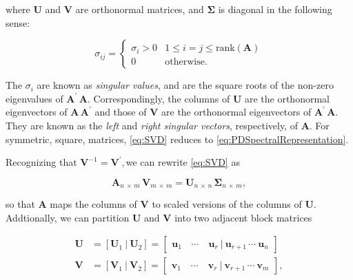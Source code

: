 \documentclass[graybox,envcountchap,sectrefs]{svmono}\usepackage[]{graphicx}\usepackage[]{xcolor}
\begin{document}
\begin{appendices}
where $\mathbf{U}$ and $\mathbf{V}$ are orthonormal matrices, and
$\mathbf{\mathbf{\Sigma}}$ is diagonal in the following sense:

\begin{equation}
\sigma_{ij}=\begin{cases}
\sigma_{i}>0 & 1\leqslant i=j\leqslant\mathrm{rank}\left(\mathbf{A}\right)\\
0 & \mathrm{otherwise}.
\end{cases}\label{eq:DiagMatrixInSVD}
\end{equation}

The $\sigma_{i}$ are known as \emph{singular values}, and are the
square roots of the non-zero eigenvalues of $\mathbf{A}^{\prime}\,\mathbf{A}$.
Correspondingly, the columns of $\mathbf{U}$ are the orthonormal
eigenvectors of $\mathbf{A}\,\mathbf{A}^{\prime}$ and those of $\mathbf{V}$
are the orthonormal eigenvectors of $\mathbf{A}^{\prime}\,\mathbf{A}$.
They are known as the \emph{left} and \emph{right singular vectors},
respectively, of $\mathrm{\mathbf{A}}$. For symmetric, square, matrices,
\eqref{eq:SVD} reduces to \eqref{eq:PDSpectralRepresentation}.

Recognizing that $\mathbf{V}^{-1}=\mathbf{V}^{\prime},$we can rewrite
\eqref{eq:SVD} as

\begin{equation}
\mathbf{\mathbf{A}}_{n\,\times\,m}\,\mathbf{V}_{m\,\times\,m}=\mathbf{U}_{n\,\times\,n}\,\mathbf{\Sigma}_{n\,\times\,m},\label{eq:SVD1}
\end{equation}

so that $\mathbf{\mathbf{A}}$ maps the columns of $\mathbf{V}$ to
scaled versions of the columns of $\mathbf{U}$. Addtionally, we can
partition $\mathbf{U}$ and $\mathbf{V}$ into two adjacent block
matrices 

\begin{subequations}
\begin{align}
\mathbf{U} & =\left[\mathrm{\mathbf{U}}_{1}\ |\ \mathrm{\mathbf{U}}_{2}\right]=\left[\begin{array}{ccc}
\mathrm{\mathbf{u}}_{1} & \,\cdots & \ \mathrm{\mathbf{u}}_{r}\ |\ \mathrm{\mathbf{u}}_{r+1}\,\cdots\ \mathrm{\mathbf{u}}_{n}\end{array}\right]\label{eq:SVDu}\\[0.5em]
\mathbf{V} & =\left[\mathrm{\mathbf{V}}_{1}\ |\ \mathrm{\mathbf{V}}_{2}\right]=\left[\begin{array}{ccc}
\mathrm{\mathbf{v}}_{1} & \,\cdots & \ \mathrm{\mathbf{v}}_{r}\ |\ \mathrm{\mathbf{v}}_{r+1}\,\cdots\ \mathrm{\mathbf{v}}_{m}\end{array}\right],\label{eq:SVDv}
\end{align}
\end{subequations}


\end{appendices}
\end{document}
